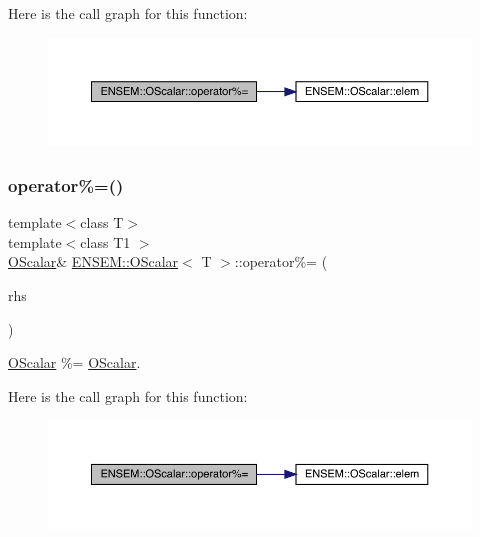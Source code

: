 Here is the call graph for this function\+:
\nopagebreak
\begin{figure}[H]
\begin{center}
\leavevmode
\includegraphics[width=350pt]{da/d80/classENSEM_1_1OScalar_a89a76b1229e185250c0b9c48ae13d98b_cgraph}
\end{center}
\end{figure}
\mbox{\label{classENSEM_1_1OScalar_a89a76b1229e185250c0b9c48ae13d98b}} 
\subsubsection{\texorpdfstring{operator\%=()}{operator\%=()}\hspace{0.1cm}{\footnotesize\ttfamily [3/3]}}
{\footnotesize\ttfamily template$<$class T$>$ \\
template$<$class T1 $>$ \\
\mbox{\hyperlink{classENSEM_1_1OScalar}{O\+Scalar}}\& \mbox{\hyperlink{classENSEM_1_1OScalar}{E\+N\+S\+E\+M\+::\+O\+Scalar}}$<$ T $>$\+::operator\%= (\begin{DoxyParamCaption}\item[{const \mbox{\hyperlink{classENSEM_1_1OScalar}{O\+Scalar}}$<$ T1 $>$ \&}]{rhs }\end{DoxyParamCaption})\hspace{0.3cm}{\ttfamily [inline]}}



\mbox{\hyperlink{classENSEM_1_1OScalar}{O\+Scalar}} \%= \mbox{\hyperlink{classENSEM_1_1OScalar}{O\+Scalar}}. 

Here is the call graph for this function\+:
\nopagebreak
\begin{figure}[H]
\begin{center}
\leavevmode
\includegraphics[width=350pt]{da/d80/classENSEM_1_1OScalar_a89a76b1229e185250c0b9c48ae13d98b_cgraph}
\end{center}
\end{figure}
\mbox{\label{classENSEM_1_1OScalar_a9a192875355f059d207c579e2514b2a3}} 
